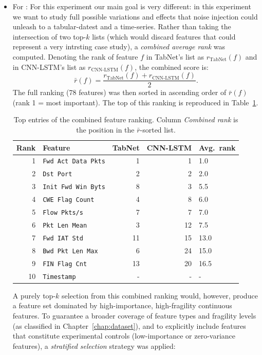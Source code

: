 \documentclass[../main.tex]{subfiles}
\begin{document}
\begin{itemize}
    \newpage
    \item For : For this experiment our main goal is very different: in this experiment we want to study full possible variations and effects that noise injection could unleash to a tabular-datest and a time-series. Rather than taking the intersection of two top-$k$ lists (which would discard features that could represent a very intrsting case study), a \emph{combined average rank} was computed.  Denoting the rank of feature $f$ in TabNet's list as $r_{\text{TabNet}}(f)$ and in CNN-LSTM's list as $r_{\text{CNN-LSTM}}(f)$, the combined score is:
    \[
        \bar{r}(f) = \frac{r_{\text{TabNet}}(f) + r_{\text{CNN-LSTM}}(f)}{2}.
    \]
    The full ranking (78 features) was then sorted in ascending order of $\bar{r}(f)$ (rank 1 = most important).  The top of this ranking is reproduced in Table~\ref{tab:combined-ranking}.
    
    \begin{table}[H]
    \centering
    \caption{Top entries of the combined feature ranking.  Column \emph{Combined rank} is the position in the $\bar{r}$-sorted list.}
    \label{tab:combined-ranking}
    \small
    \begin{tabular}{rlrrl}
    \toprule
    \textbf{Rank} & \textbf{Feature}     & \textbf{TabNet} & \textbf{CNN-LSTM} & \textbf{Avg.\ rank} \\
    \midrule
    1  & \texttt{Fwd Act Data Pkts}   & 1  & 1  & 1.0  \\
    2  & \texttt{Dst Port}            & 2  & 2  & 2.0  \\
    3  & \texttt{Init Fwd Win Byts}   & 8  & 3  & 5.5  \\
    4  & \texttt{CWE Flag Count}      & 4  & 8  & 6.0  \\
    5  & \texttt{Flow Pkts/s}         & 7  & 7  & 7.0  \\
    6  & \texttt{Pkt Len Mean}        & 3  & 12 & 7.5  \\
    7  & \texttt{Fwd IAT Std}         & 11 & 15 & 13.0 \\
    8  & \texttt{Bwd Pkt Len Max}     & 6  & 24 & 15.0 \\
    9  & \texttt{FIN Flag Cnt}        & 13 & 20 & 16.5 \\
    10 & \texttt{Timestamp}          & -  & -  & -    \\
    \bottomrule
    \end{tabular}
    \end{table}
    
    A purely top-$k$ selection from this combined ranking would, however, produce a feature set dominated by high-importance, high-fragility continuous features. To guarantee a broader coverage of feature types and fragility levels (as classified in Chapter~\ref{chap:dataset}), and to explicitly include features that constitute experimental controls (low-importance or zero-variance features), a \emph{stratified selection} strategy was applied:
    

\end{itemize}
\end{document}
